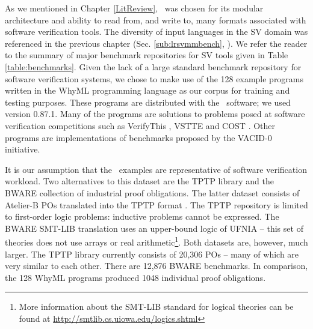 As we mentioned in Chapter \ref{LitReview}, \why~was chosen for its modular architecture and ability to read from, and write to, many formats associated with software verification tools. The diversity of input languages in the SV domain was referenced in the previous chapter (Sec. \ref{sub:lrsvmmbench}, \cite{Dagstuhl, deductiveSV}). %
%
We refer the reader to the summary of major benchmark repositories for SV tools given in Table \ref{table:benchmarks}. 
Given the lack of a large standard benchmark repository for software verification systems, we chose to make use of the 128 example programs written in the WhyML programming language as our corpus for training and testing purposes. 
These programs are distributed with the \why~software; we used version 0.87.1. 
Many of the programs are solutions to problems posed at software verification competitions such as VerifyThis \cite{verifythis}, VSTTE \cite{Klebanov2011} and COST \cite{bormer:hal-00789525}. 
Other programs are implementations of benchmarks proposed by the VACID-0 \cite{Leino10vacid-0:verification} initiative.   

It is our assumption that the \why~examples are representative of software verification workload. Two alternatives to this dataset are the TPTP \cite{TPTP} library and the BWARE \cite{Delahaye2014} collection of industrial proof obligations. The latter dataset consists of Atelier-B  POs translated into the TPTP format \cite{atelierB2w}. 
The TPTP repository is limited to first-order logic problems: inductive problems cannot be expressed. 
The BWARE SMT-LIB translation uses an upper-bound logic of UFNIA -- this set of theories does not use arrays or real arithmetic\footnote{More information about the SMT-LIB standard for logical theories can be found at \url{http://smtlib.cs.uiowa.edu/logics.shtml} }. 
Both datasets are, however, much larger. The TPTP library currently consists of 20,306 POs \cite{TPTPsite} -- many of which are very similar to each other. There are 12,876 BWARE benchmarks. In comparison, the 128 WhyML programs produced 1048 individual proof obligations. 

